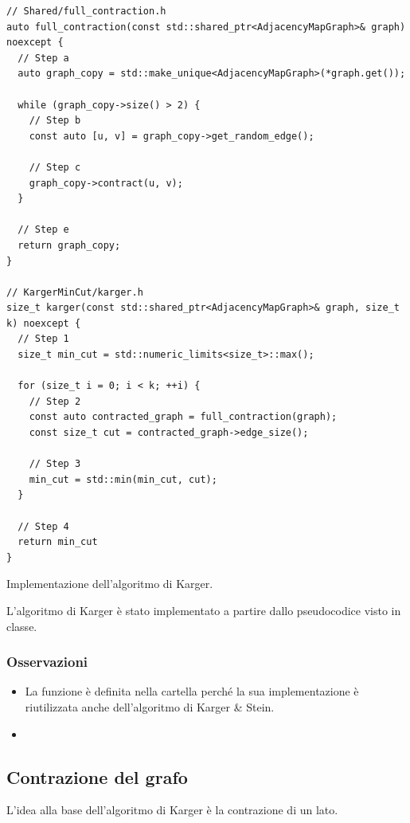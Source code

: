 \begin{listing}[!ht]
\begin{verbatim}
// Shared/full_contraction.h
auto full_contraction(const std::shared_ptr<AdjacencyMapGraph>& graph) noexcept {
  // Step a
  auto graph_copy = std::make_unique<AdjacencyMapGraph>(*graph.get());

  while (graph_copy->size() > 2) {
    // Step b
    const auto [u, v] = graph_copy->get_random_edge();
    
    // Step c
    graph_copy->contract(u, v);
  }
  
  // Step e
  return graph_copy;
}

// KargerMinCut/karger.h
size_t karger(const std::shared_ptr<AdjacencyMapGraph>& graph, size_t k) noexcept {
  // Step 1
  size_t min_cut = std::numeric_limits<size_t>::max();
  
  for (size_t i = 0; i < k; ++i) {
    // Step 2
    const auto contracted_graph = full_contraction(graph);
    const size_t cut = contracted_graph->edge_size();
    
    // Step 3
    min_cut = std::min(min_cut, cut);
  }
  
  // Step 4
  return min_cut
}
\end{verbatim}
\caption{Implementazione dell'algoritmo di Karger.}
\label{listing:karger}
\end{listing}

\noindent L'algoritmo di Karger è stato implementato a partire dallo pseudocodice visto in classe. \\

\subsubsection{Osservazioni}

\begin{itemize}
    \item La funzione  è definita nella cartella  perché la sua implementazione è riutilizzata anche dell'algoritmo di Karger \& Stein.
    \item 
\end{itemize}

\subsection{Contrazione del grafo}
\label{sub:karger-contraction}

L'idea alla base dell'algoritmo di Karger è la contrazione di un lato.


